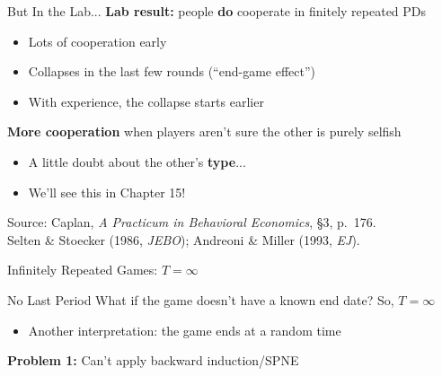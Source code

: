 \begin{frame}{But In the Lab...}
\textbf{Lab result:} people \textbf{do} cooperate in finitely repeated PDs
\begin{itemize}
    \item Lots of cooperation early
    \item Collapses in the last few rounds (``end-game effect'')
    \item With experience, the collapse starts earlier
\end{itemize}
\bsk
\textbf{More cooperation} when players aren't sure the other is purely selfish
\begin{itemize}
    \item A little doubt about the other's \textbf{type}...
    \item We'll see this in Chapter 15!
\end{itemize}
\vfill
{\footnotesize Source: Caplan, \textit{A Practicum in Behavioral Economics}, \S3, p.~176.\\ Selten \& Stoecker (1986, \textit{JEBO}); Andreoni \& Miller (1993, \textit{EJ}).}
\vspace{-0.2in}
\end{frame}


\begin{frame}[standout]
Infinitely Repeated Games: $T=\infty$
\end{frame}

\begin{frame}{No Last Period}
What if the game doesn't have a known end date? So, $T=\infty$
\begin{itemize}
    \item Another interpretation: the game ends at a random time
\end{itemize}
\bsk
\textbf{Problem 1:} Can't apply backward induction/SPNE
\bsk
{}
\bsk
{}
\vspace{-0.3in}
\end{frame}

